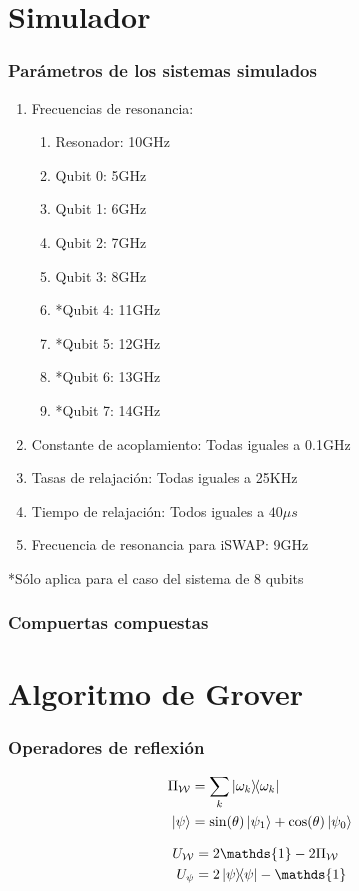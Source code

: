 \documentclass[xetex,mathserif,serif]{beamer}
\begin{document}
\section{Simulador}

\begin{frame}
    \frametitle{Parámetros de los sistemas simulados}

    \begin{enumerate}
        \item Frecuencias de resonancia:
            \begin{enumerate}
                \item Resonador: 10GHz
                \item Qubit 0: 5GHz
                \item Qubit 1: 6GHz
                \item Qubit 2: 7GHz
                \item Qubit 3: 8GHz
                \item *Qubit 4: 11GHz
                \item *Qubit 5: 12GHz
                \item *Qubit 6: 13GHz
                \item *Qubit 7: 14GHz
            \end{enumerate}
        \item Constante de acoplamiento: Todas iguales a 0.1GHz
        \item Tasas de relajación: Todas iguales a 25KHz
        \item Tiempo de relajación: Todos iguales a $40 \mu s$
        \item Frecuencia de resonancia para iSWAP: 9GHz
    \end{enumerate}

    *Sólo aplica para el caso del sistema de 8 qubits

\end{frame}

\begin{frame}
    \frametitle{Compuertas compuestas}

\end{frame}

\section{Algoritmo de Grover}

\begin{frame}
    \frametitle{Operadores de reflexión}

    \begin{align}
        \Pi_\mathcal{W} &= \sum_k \ketbra{\omega_k} \\
        \ket{\psi} &= \sin(\theta) \ket{\psi_1} + \cos(\theta) \ket{\psi_0}
    \end{align}

    \begin{align}
        U_\mathcal{W} &= 2 \mathds{1} - 2 \Pi_\mathcal{W}\\
        U_\psi &= 2 \ketbra{\psi} - \mathds{1}
    \end{align}
\end{frame}
\end{document}
